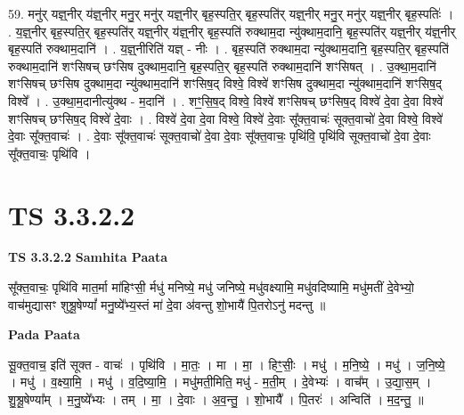 \documentclass[17pt]{extarticle}
\begin{document}
59. मनु॑र् यज्ञ्॒नीर् य॑ज्ञ्॒नीर् मनु॒र् मनु॑र् यज्ञ्॒नीर् बृह॒स्पति॒र् बृह॒स्पति॑र् यज्ञ्॒नीर् मनु॒र् मनु॑र् यज्ञ्॒नीर् बृह॒स्पतिः॑ । . य॒ज्ञ्॒नीर् बृह॒स्पति॒र् बृह॒स्पति॑र् यज्ञ्॒नीर् य॑ज्ञ्॒नीर् बृह॒स्पति॑ रुक्थाम॒दा न्यु॑क्थाम॒दानि॒ बृह॒स्पति॑र् यज्ञ्॒नीर् य॑ज्ञ्॒नीर् बृह॒स्पति॑ रुक्थाम॒दानि॑ । . य॒ज्ञ्॒नीरिति॑ यज्ञ् - नीः । . बृह॒स्पति॑ रुक्थाम॒दा न्यु॑क्थाम॒दानि॒ बृह॒स्पति॒र् बृह॒स्पति॑ रुक्थाम॒दानि॑ 
शꣳसिषच् छꣳसिष दुक्थाम॒दानि॒ बृह॒स्पति॒र् बृह॒स्पति॑ रुक्थाम॒दानि॑ शꣳसिषत् । . उ॒क्था॒म॒दानि॑ शꣳसिषच् छꣳसिष दुक्थाम॒दा न्यु॑क्थाम॒दानि॑ शꣳसिष॒द् विश्वे॒ विश्वे॑ 
शꣳसिष दुक्थाम॒दा न्यु॑क्थाम॒दानि॑ शꣳसिष॒द् विश्वे᳚ । . उ॒क्था॒म॒दानीत्यु॑क्थ - म॒दानि॑ । . शꣳ॒॒सि॒ष॒द् विश्वे॒ विश्वे॑ शꣳसिषच् छꣳसिष॒द् विश्वे॑ दे॒वा दे॒वा विश्वे॑ शꣳसिषच् छꣳसिष॒द् विश्वे॑ दे॒वाः । . विश्वे॑ दे॒वा दे॒वा विश्वे॒ विश्वे॑ दे॒वाः सू᳚क्त॒वाचः॑ सूक्त॒वाचो॑ दे॒वा विश्वे॒ विश्वे॑ दे॒वाः सू᳚क्त॒वाचः॑ । . दे॒वाः सू᳚क्त॒वाचः॑ सूक्त॒वाचो॑ दे॒वा दे॒वाः सू᳚क्त॒वाचः॒ पृथि॑वि॒ पृथि॑वि सूक्त॒वाचो॑ दे॒वा दे॒वाः सू᳚क्त॒वाचः॒ पृथि॑वि । \newline
\pagebreak
{}

\section{ TS 3.3.2.2 }

\textbf{TS 3.3.2.2 } \newline
\textbf{Samhita Paata} \newline

सू᳚क्त॒वाचः॒ पृथि॑वि मात॒र्मा मा॑हिꣳसी॒ र्मधु॑ मनिष्ये॒ मधु॑ जनिष्ये॒ मधु॑वक्ष्यामि॒ मधु॑वदिष्यामि॒ मधु॑मतीं दे॒वेभ्यो॒ वाच॑मुद्यासꣳ शुश्रू॒षेण्यां᳚ मनु॒ष्ये᳚भ्य॒स्तं मा॑ दे॒वा अ॑वन्तु शो॒भायै॑ पि॒तरोऽनु॑ मदन्तु ॥ \newline

\textbf{Pada Paata} \newline

सू॒क्त॒वाच॒ इति॑ सूक्त - वाचः॑ । पृथि॑वि । मा॒तः॒ । मा । मा॒ । हिꣳ॒॒सीः॒ । मधु॑ । म॒नि॒ष्ये॒ । मधु॑ । ज॒नि॒ष्ये॒ । मधु॑ । व॒क्ष्या॒मि॒ । मधु॑ । व॒दि॒ष्या॒मि॒ । मधु॑मती॒मिति॒ मधु॑ - म॒ती॒म् । दे॒वेभ्यः॑ । वाच᳚म् । उ॒द्या॒स॒म् । शु॒श्रू॒षेण्या᳚म् । म॒नु॒ष्ये᳚भ्यः । तम् । मा॒ । दे॒वाः । अ॒व॒न्तु॒ । शो॒भायै᳚ । पि॒तरः॑ । अन्विति॑ । म॒द॒न्तु॒ ॥  \newline
\end{document}
